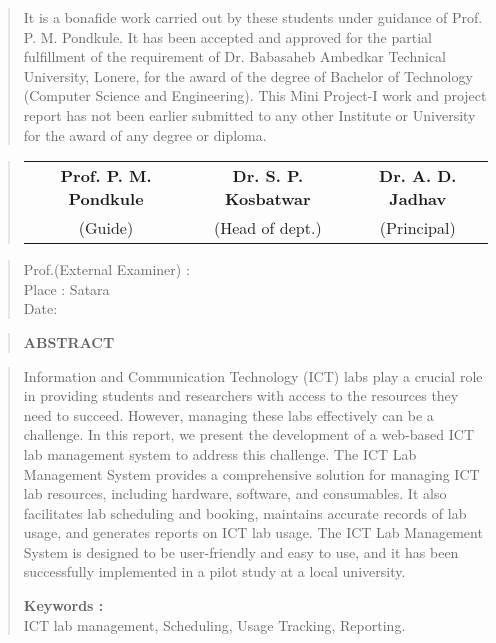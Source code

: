 \documentclass[12pt]{report}
\begin{document}
	\vspace{-0.9cm}
	\begin{quote}
		\normalsize
		It is a bonafide work carried out by these students under guidance of
		Prof. P. M. Pondkule. It has been accepted and approved for the partial
		fulfillment of the requirement of Dr. Babasaheb Ambedkar Technical
		University, Lonere, for the award of the degree of Bachelor of
		Technology (Computer Science and Engineering). This Mini Project-I work and project
		report has not been earlier submitted to any other Institute or University for the
		award of any degree or diploma.
	\end{quote}
	
	\begin{quote}
		\normalsize
		\centering
		\vspace{3cm}
		\begin{table}[ht]
			\centering
			\begin{tabular}{c  c  c}
				\bfseries
				Prof. P. M. Pondkule  & \bfseries Dr. S. P. Kosbatwar & \bfseries Dr. A. D. Jadhav \\[2ex]
				(Guide) & (Head of dept.) & (Principal)\\[2ex]
			\end{tabular}
		\end{table}
	\end{quote}
	\vspace{2cm}
	\begin{quote}
		Prof.(External Examiner) :\\Place : Satara\\Date:
	\end{quote}
	\newpage
	
	
	\begin{quote}
		\centering
		\LARGE
		\textbf{ABSTRACT}
	\end{quote}
	
	
	\begin{quote}
		
		\hspace{1cm}Information and Communication Technology (ICT) labs play a crucial role in providing students and researchers with access to the resources they need to succeed. However, managing these labs effectively can be a challenge. In this report, we present the development of a web-based ICT lab management system to address this challenge. The ICT Lab Management System provides a comprehensive solution for managing ICT lab resources, including hardware, software, and consumables. It also facilitates lab scheduling and booking, maintains accurate records of lab usage, and generates reports on ICT lab usage. The ICT Lab Management System is designed to be user-friendly and easy to use, and it has been successfully implemented in a pilot study at a local university. 
		
		\textbf{Keywords :}\\[1ex]
		ICT lab management, Scheduling, Usage Tracking, Reporting.
	\end{quote}
	\clearpage
	\tableofcontents
	\newpage
	
\end{document}
